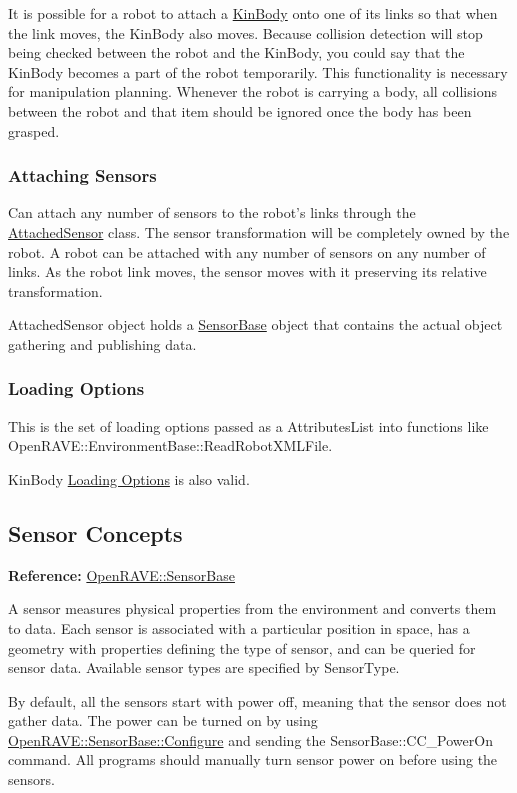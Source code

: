 It is possible for a robot to attach a \hyperlink{classOpenRAVE_1_1KinBody}{KinBody} onto one of its links so that when the link moves, the KinBody also moves. Because collision detection will stop being checked between the robot and the KinBody, you could say that the KinBody becomes a part of the robot temporarily. This functionality is necessary for manipulation planning. Whenever the robot is carrying a body, all collisions between the robot and that item should be ignored once the body has been grasped.\hypertarget{arch__robot_arch_robot_sensors}{}\subsubsection{Attaching Sensors}\label{arch__robot_arch_robot_sensors}
Can attach any number of sensors to the robot's links through the \hyperlink{classOpenRAVE_1_1RobotBase_1_1AttachedSensor}{AttachedSensor} class. The sensor transformation will be completely owned by the robot. A robot can be attached with any number of sensors on any number of links. As the robot link moves, the sensor moves with it preserving its relative transformation.

AttachedSensor object holds a \hyperlink{classOpenRAVE_1_1SensorBase}{SensorBase} object that contains the actual object gathering and publishing data.\hypertarget{arch__robot_arch_robot_options}{}\subsubsection{Loading Options}\label{arch__robot_arch_robot_options}
This is the set of loading options passed as a AttributesList into functions like OpenRAVE::EnvironmentBase::ReadRobotXMLFile.

KinBody \hyperlink{arch__kinbody_arch_kinbody_options}{Loading Options} is also valid. \hypertarget{arch_sensor}{}\subsection{Sensor Concepts}\label{arch_sensor}
{\bfseries Reference:} \hyperlink{classOpenRAVE_1_1SensorBase}{OpenRAVE::SensorBase}

A sensor measures physical properties from the environment and converts them to data. Each sensor is associated with a particular position in space, has a geometry with properties defining the type of sensor, and can be queried for sensor data. Available sensor types are specified by SensorType.

By default, all the sensors start with power off, meaning that the sensor does not gather data. The power can be turned on by using \hyperlink{classOpenRAVE_1_1SensorBase_ae02c7c4987dd11f5fb7657e18c7c8318}{OpenRAVE::SensorBase::Configure} and sending the SensorBase::CC\_\-PowerOn command. All programs should manually turn sensor power on before using the sensors.

